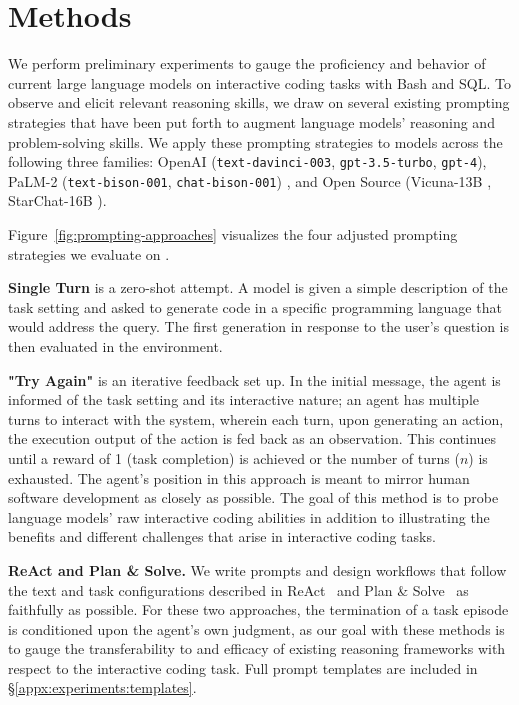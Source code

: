 \section{Methods}
\label{sec:methods}
We perform preliminary experiments to gauge the proficiency and behavior of current large language models on interactive coding tasks with Bash and SQL. To observe and elicit relevant reasoning skills, we draw on several existing prompting strategies that have been put forth to augment language models' reasoning and problem-solving skills. We apply these prompting strategies to models across the following three families: OpenAI (\texttt{text-davinci-003}, \texttt{gpt-3.5-turbo}, \texttt{gpt-4}), PaLM-2 (\texttt{text-bison-001}, \texttt{chat-bison-001}) \cite{anil2023palm}, and Open Source (Vicuna-13B \cite{vicuna2023}, StarChat-16B \cite{li2023starcoder}).

Figure~\ref{fig:prompting-approaches} visualizes the four adjusted prompting strategies we evaluate on \benchmark{}.

\textbf{Single Turn} is a zero-shot attempt. A model is given a simple description of the task setting and asked to generate code in a specific programming language that would address the query. The first generation in response to the user's question is then evaluated in the \benchmark{} environment.



\textbf{"Try Again"} is an iterative feedback set up. In the initial message, the agent is informed of the task setting and its interactive nature; an agent has multiple turns to interact with the system, wherein each turn, upon generating an action, the execution output of the action is fed back as an observation. This continues until a reward of 1 (task completion) is achieved or the number of turns ($n$) is exhausted. The agent's position in this approach is meant to mirror human software development as closely as possible. The goal of this method is to probe language models' raw interactive coding abilities in addition to illustrating the benefits and different challenges that arise in interactive coding tasks.

\textbf{ReAct and Plan \& Solve.} We write prompts and design workflows that follow the text and task configurations described in ReAct~\cite{yao2023react} and Plan \& Solve~\cite{wang2023planandsolve} as faithfully as possible. For these two approaches, the termination of a task episode is conditioned upon the agent's own judgment, as our goal with these methods is to gauge the transferability to and efficacy of existing reasoning frameworks with respect to the interactive coding task.
Full prompt templates are included in \S\ref{appx:experiments:templates}.
